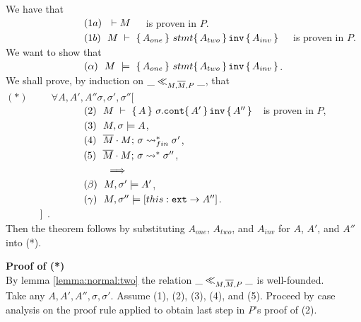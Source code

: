  We have that \\
 $\strut \ \ \hspace{2.3cm} \ \ (1a) \ \ \vdash M $\ \ \  is proven in $P$.\\
$\strut \ \ \hspace{2.3cm} \ \ (1b) \ \ M\ \vdash\  \quadruple {A_{one}}  {stmt}{A_{two}} {A_{inv}}$ \ \  is proven in $P$.
\\
We want to show  that\\
 $\strut \ \ \hspace{2.3cm} \ \ (\alpha)\  \  M\ \models\  \quadruple {A_{one}}  {stmt}{A_{two}} {A_{inv}}$. 
 \\ 
We shall prove,  by induction on $\_ \ll_{M,\overline{M},P}  \_$, that 
\\ 
$(*) \hspace{1cm} \forall A, A', A'' \sigma, \sigma',\sigma''[$\\
$\strut \ \ \hspace{2.3cm} \ \ (2) \ \ M\ \vdash\  \quadruple {A}  {\sigma.\prg{cont}} {A'} {A''} \ \ $ is proven in $P$,\\
$\strut \ \ \hspace{2.3cm} \ \ (3) \ \ M, \sigma \models A$, \\
$\strut \ \ \hspace{2.3cm} \ \ (4) \ \ \leadstoBoundedStarFin {\Mtwo\cdot M}  {\sigma}  {\sigma'}$,\\
$\strut \ \ \hspace{2.3cm} \ \ (5) \ \ \leadstoBoundedStar  {\Mtwo\cdot M}  {\sigma}  {\sigma''}$,\\
$\strut \ \ \hspace{2.3cm} \ \ \ \ \ \ \ \ \ \Longrightarrow$\\
$\strut  \ \ \hspace{2.3cm} \ \ (\beta)\ \  M, \sigma' \models A'$,\\
$\strut  \ \ \hspace{2.3cm} \ \ (\gamma)\ \  M, \sigma'' \models [\external{this} \rightarrow A'']$.\\
$\strut \ \   \hspace{1cm} ]$
.
\\
Then the  theorem follows by substituting $A_{one}$, $A_{two}$, and $A_{inv}$ for $A$, $A'$, and $A''$ into (*).


\vspace{.1cm}
\noindent
\textbf{Proof of (*)}\\
By lemma \ref{lemma:normal:two} the relation $\_ \ll_{M,\overline{M},P}  \_$ is well-founded.
\\
Take any $A, A', A'', \sigma, \sigma'$. Assume  (1), (2), (3),  (4), and (5).
Proceed by case analysis on the proof rule applied to obtain last step in $P$'s proof of (2).

